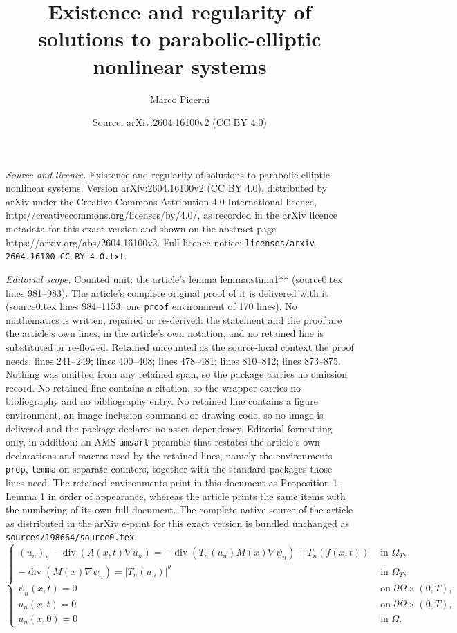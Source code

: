 \documentclass[10pt,a4paper]{amsart}
\title{Existence and regularity of solutions to parabolic-elliptic nonlinear systems}
\author{Marco Picerni}
\date{Source: arXiv:2604.16100v2 (CC BY 4.0)}
\begin{document}
\maketitle

\noindent\emph{Source and licence.} Existence and regularity of solutions to parabolic-elliptic nonlinear systems. Version arXiv:2604.16100v2 (CC BY 4.0), distributed by arXiv under the Creative Commons Attribution 4.0 International licence, http://creativecommons.org/licenses/by/4.0/, as recorded in the arXiv licence metadata for this exact version and shown on the abstract page https://arxiv.org/abs/2604.16100v2. Full licence notice: \texttt{licenses/arxiv-2604.16100-CC-BY-4.0.txt}.\par\smallskip

\noindent\textit{Editorial scope.} Counted unit: the article's lemma lemma:stima1** (source0.tex lines 981--983). The article's complete original proof of it is delivered with it (source0.tex lines 984--1153, one \texttt{proof} environment of 170 lines). No mathematics is written, repaired or re-derived: the statement and the proof are the article's own lines, in the article's own notation, and no retained line is substituted or re-flowed.  Retained uncounted as the source-local context the proof needs: lines 241--249; lines 400--408; lines 478--481; lines 810--812; lines 873--875.  Nothing was omitted from any retained span, so the package carries no omission record.  No retained line contains a citation, so the wrapper carries no bibliography and no bibliography entry.  No retained line contains a figure environment, an image-inclusion command or drawing code, so no image is delivered and the package declares no asset dependency.  Editorial formatting only, in addition: an AMS \texttt{amsart} preamble that restates the article's own declarations and macros used by the retained lines, namely the environments \texttt{prop}, \texttt{lemma} on separate counters, together with the standard packages those lines need.  The retained environments print in this document as Proposition 1, Lemma 1 in order of appearance, whereas the article prints the same items with the numbering of its own full document.  The complete native source of the article as distributed in the arXiv e-print for this exact version is bundled unchanged as \texttt{sources/198664/source0.tex}.
\begin{equation}\label{eq:approx_KS_system}
    \left\{\begin{array}{cc}
    (u_n)_t-\operatorname{div}(A(x, t) \nabla u_n)=-\operatorname{div}(T_n(u_n) M(x) \nabla \psi_n)+T_n(f(x,t)) & \text { in } \Omega_T, \\
    -\operatorname{div}(M(x) \nabla \psi_n)=|T_n(u_n)|^\theta & \text { in } \Omega_T, \\
    \psi_n(x, t)=0 & \text { on } \partial\Omega\times(0, T), \\
    u_n(x, t)=0 & \text { on } \partial\Omega\times(0, T), \\
    u_n(x, 0)=0 & \text { in } \Omega.
    \end{array}\right.
\end{equation}
\end{document}

